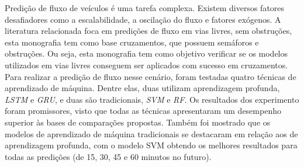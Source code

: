 Predição de fluxo de veículos é uma tarefa complexa. Existem diversos fatores desafiadores como a escalabilidade, a oscilação do fluxo e fatores exógenos. A literatura relacionada foca em predições de fluxo em vias livres, sem obstruções, esta monografia tem como base cruzamentos, que possuem semáforos e obstruções. Ou seja, esta monografia tem como objetivo verificar se os modelos utilizados em vias livres conseguem ser aplicados com sucesso em cruzamentos.  Para realizar a predição de fluxo nesse cenário, foram testadas quatro técnicas de aprendizado de máquina. Dentre elas, duas utilizam aprendizagem profunda, \textit{\acrfull{LSTM}} e \textit{\acrfull{GRU}}, e duas são tradicionais, \textit{\acrfull{SVM}} e \textit{\acrfull{RF}}. Os resultados dos experimento foram promissores, visto que todas as técnicas apresentaram um desempenho superior às bases de comparações propostas. Também foi mostrado que os modelos de aprendizado de máquina tradicionais se destacaram em relação aos de aprendizagem profunda, com o modelo \acrshort{SVM} obtendo os melhores resultados para todas as predições (de 15, 30, 45 e 60 minutos no futuro).